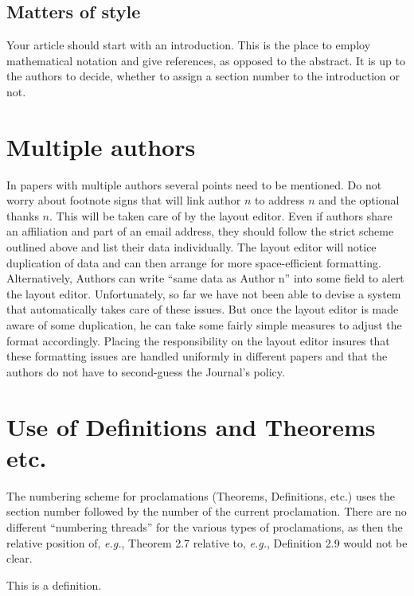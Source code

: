 \documentclass{lmcs} %
\theoremstyle{plain}\newtheorem{satz}[thm]{Satz} %
\def\eg{{\em e.g.}}
\begin{document}
\subsection*{Matters of style}

  Your article should start with an introduction.  This is the place
  to employ mathematical notation and give references, as opposed to
  the abstract.  It is up to the authors to decide, whether to assign
  a section number to the introduction or not.

\section{Multiple authors}

  In papers with multiple authors several points need to be mentioned.
  Do not worry about footnote signs that will link author $n$ to
  address $n$ and the optional thanks $n$.  This will be taken care of
  by the layout editor.  Even if authors share an affiliation and part
  of an email address, they should follow the strict scheme outlined
  above and list their data individually.  The layout editor will
  notice duplication of data and can then arrange for more
  space-efficient formatting.  Alternatively, Authors can write ``same
  data as Author n'' into some field to alert the layout editor.
  Unfortunately, so far we have not been able to devise a system that
  automatically takes care of these issues.  But once the layout
  editor is made aware of some duplication, he can take some fairly
  simple measures to adjust the format accordingly.  Placing the
  responsibility on the layout editor insures that these formatting
  issues are handled uniformly in different papers and that the
  authors do not have to second-guess the Journal's policy.

\section{Use of  Definitions and Theorems etc.}

  The numbering scheme for proclamations (Theorems, Definitions, etc.)
  uses the section number followed by the number of the current
  proclamation.  There are no different ``numbering threads'' for the
  various types of proclamations, as then the relative position of,
  \eg, Theorem 2.7 relative to, \eg, Definition 2.9 would not be clear.

\begin{defi}\label{D:first}
  This is a definition.
\end{defi}
\end{document}
